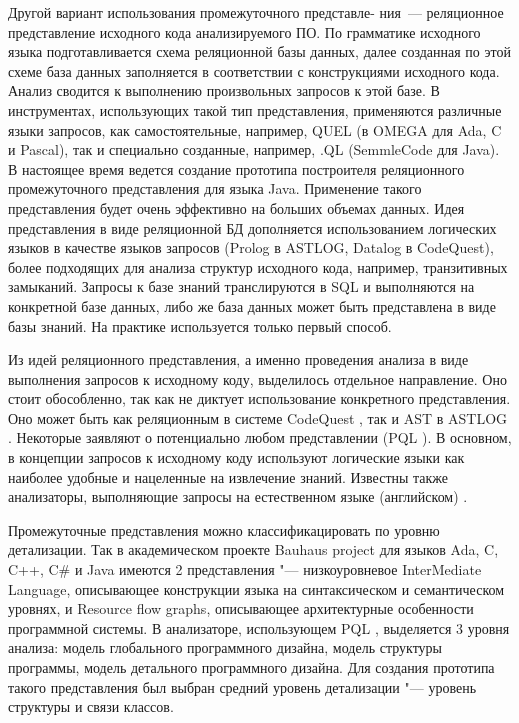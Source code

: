 \documentclass[10pt, a5paper]{article}
\begin{document}
Другой вариант использования промежуточного представле- \linebreak ния~--- реляционное представление исходного кода анализируемого ПО. По грамматике исходного языка подготавливается схема реляционной базы данных, далее созданная по этой схеме база данных заполняется в соответствии с конструкциями исходного кода. Анализ сводится к выполнению произвольных запросов к этой базе. В инструментах, использующих такой тип представления, применяются различные языки запросов, как самостоятельные, например, QUEL \cite{Zubov9} (в OMEGA \cite{Zubov10} для Ada, C и Pascal), так и специально созданные, например, .QL \cite{Zubov11} (SemmleCode \cite{Zubov12} для Java). В настоящее время ведется создание прототипа построителя реляционного промежуточного представления для языка Java. Применение такого представления будет очень эффективно на больших объемах данных. Идея представления в виде реляционной БД дополняется использованием логических языков в качестве языков запросов (Prolog в ASTLOG\cite{Zubov13}, Datalog в CodeQuest\cite{Zubov14}), более подходящих для анализа структур исходного кода, например, транзитивных замыканий. Запросы к базе знаний транслируются в SQL и выполняются на конкретной базе данных, либо же база данных может быть представлена в виде базы знаний. На практике используется только первый способ.

Из идей реляционного представления, а именно проведения анализа в виде выполнения запросов к исходному коду, выделилось отдельное направление. Оно стоит обособленно, так как не диктует использование конкретного представления. Оно может быть как реляционным в системе CodeQuest \cite{Zubov14}, так и AST в ASTLOG \cite{Zubov13}. Некоторые заявляют о потенциально любом представлении (PQL \cite{Zubov15}). В основном, в концепции запросов к исходному коду используют логические языки как наиболее удобные и нацеленные на извлечение знаний. Известны также анализаторы, выполняющие запросы на естественном языке (английском) \cite{Zubov16}.

Промежуточные представления можно классификацировать по уровню детализации. Так в академическом проекте Bauhaus project \cite{Zubov17} для языков Ada, C, C++, C\# и Java имеются 2 представления "--- низкоуровневое InterMediate Language, описывающее конструкции языка на синтаксическом и семантическом уровнях, и Resource flow graphs, описывающее архитектурные особенности программной системы. В анализаторе, использующем PQL \cite{Zubov15}, выделяется 3 уровня анализа: модель глобального программного дизайна, модель \linebreak структуры программы, модель детального программного дизайна. Для создания прототипа такого представления был выбран средний уровень детализации "--- уровень структуры и связи классов.
\end{document}
